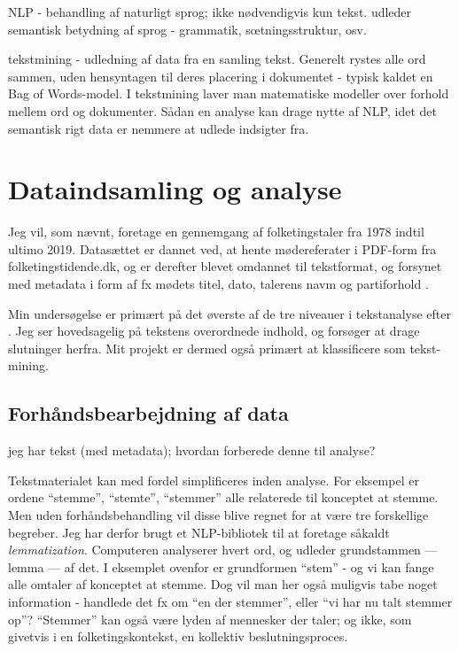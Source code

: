 NLP - behandling af naturligt sprog;  ikke nødvendigvis kun tekst.
udleder semantisk betydning af sprog - grammatik, sœtningsstruktur, osv. 

tekstmining - udledning af data fra en samling tekst.
Generelt rystes alle ord sammen, uden hensyntagen til deres placering i dokumentet - typisk kaldet en Bag of Words-model.
I tekstmining laver man matematiske modeller over forhold mellem ord og dokumenter.
Sådan en analyse kan drage nytte af NLP, idet det semantisk rigt data er nemmere at udlede indsigter fra.
\chapter{Dataindsamling og analyse}\label{chap:data}

Jeg vil, som nævnt, foretage en gennemgang af folketingstaler fra 1978 indtil ultimo 2019.
Datasættet er dannet ved, at hente mødereferater i PDF-form fra folketingstidende.dk, og er derefter blevet omdannet til tekstformat, og forsynet med metadata i form af fx mødets titel, dato, talerens navm og partiforhold  \autocite{pedersenFolketinget2019}.

Min undersøgelse er primært på det øverste af de tre niveauer i tekstanalyse efter \autocite{evansMachineTranslationMining2015}. 
Jeg ser hovedsagelig på tekstens overordnede indhold, og forsøger at drage slutninger herfra.
Mit projekt er dermed også primært at klassificere som tekst-mining.


\section{Forhåndsbearbejdning af data}\label{sec:preproc}

jeg har tekst (med metadata); hvordan forberede denne til analyse?

Tekstmaterialet kan med fordel simplificeres inden analyse.
For eksempel er ordene “stemme”, “stemte”, “stemmer” alle relaterede til konceptet at stemme.
Men uden forhåndsbehandling vil disse blive regnet for at være tre forskellige begreber.
Jeg har derfor brugt et NLP-bibliotek til at foretage såkaldt \textit{lemmatization}.
Computeren analyserer hvert ord, og udleder grundstammen --- lemma — af det. I eksemplet ovenfor er grundformen “stem” - og vi kan fange alle omtaler af konceptet at stemme.
Dog vil man her også muligvis tabe noget information - handlede det fx om “en der stemmer”, eller “vi har nu talt stemmer op”?
“Stemmer” kan også være lyden af mennesker der taler; og ikke, som givetvis i en folketingskontekst, en kollektiv beslutningsproces.

